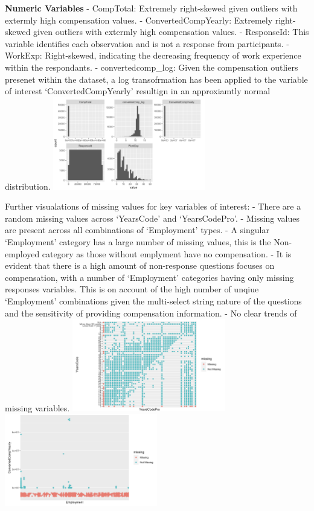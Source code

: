 \documentclass[
  12pt,
]{article}
\begin{document}
\textbf{Numeric Variables} - CompTotal: Extremely right-skewed given
outliers with extermly high compensation values. - ConvertedCompYearly:
Extremely right-skewed given outliers with extermly high compensation
values. - ResponseId: This variable identifies each observation and is
not a response from participants. - WorkExp: Right-skewed, indicating
the decreasing frequency of work experience within the respondants. -
convertedcomp\_log: Given the compensation outliers presenet within the
dataset, a log transofrmation has been applied to the variable of
interest `ConvertedCompYearly' resultign in an approxiamtly normal
distribution.
\includegraphics[width=0.5\textwidth,height=0.5\textheight]{Numerical_variables_hist.png}

Further visualations of missing values for key variables of interest: -
There are a random missing values across `YearsCode' and `YearsCodePro'.
- Missing values are present across all combinations of `Employment'
types. - A singular `Employment' category has a large number of missing
values, this is the Non-employed category as those without emplyment
have no compensation. - It is evident that there is a high amount of
non-response questions focuses on compensation, with a number of
`Employment' categories having only missing responses variables. This is
on account of the high number of unqiue `Employment' combinations given
the multi-select string nature of the questions and the sensitivity of
providing compensation information. - No clear trends of missing
variables.
\includegraphics[width=0.5\textwidth,height=0.5\textheight]{MV_YearsCode_vs_Pro.png}
\includegraphics[width=0.5\textwidth,height=0.5\textheight]{MV_Employment_vs_converted_comp.png}
\end{document}
